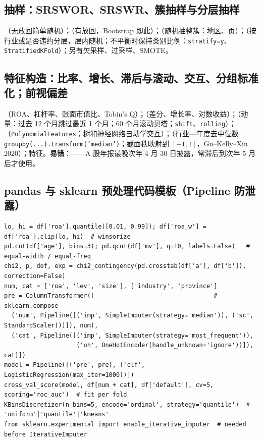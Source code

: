 \subsection{抽样：SRSWOR、SRSWR、簇抽样与分层抽样}
（无放回简单随机）；（有放回，Bootstrap 即此）；（随机抽整簇：地区、页）；（按行业或是否违约分层，层内随机；不平衡时保持类别比例：\texttt{stratify=y}、\texttt{StratifiedKFold}）；另有欠采样、过采样、SMOTE。

\subsection{特征构造：比率、增长、滞后与滚动、交互、分组标准化；前视偏差}
（ROA、杠杆率、账面市值比、Tobin's Q）；（差分、增长率、对数收益）；（动量：过去 12 个月跳过最近 1 个月；60 个月滚动贝塔；\texttt{shift}、\texttt{rolling}）；（\texttt{PolynomialFeatures}；树和神经网络自动学交互）；（行业—年度去中位数 \texttt{groupby(...).transform('median')}；截面秩映射到 $[-1,1]$，Gu–Kelly–Xiu 2020）；特征。\textbf{易错}：——A 股年报最晚次年 4 月 30 日披露，常滞后到次年 5 月后才使用。

\subsection{pandas 与 sklearn 预处理代码模板（Pipeline 防泄露）}
\begin{lstlisting}[basicstyle=\ttfamily\footnotesize]
lo, hi = df['roa'].quantile([0.01, 0.99]); df['roa_w'] = df['roa'].clip(lo, hi)  # winsorize
pd.cut(df['age'], bins=3); pd.qcut(df['mv'], q=10, labels=False)   # equal-width / equal-freq
chi2, p, dof, exp = chi2_contingency(pd.crosstab(df['a'], df['b']), correction=False)
num, cat = ['roa', 'lev', 'size'], ['industry', 'province']
pre = ColumnTransformer([                                 # sklearn.compose
  ('num', Pipeline([('imp', SimpleImputer(strategy='median')), ('sc', StandardScaler())]), num),
  ('cat', Pipeline([('imp', SimpleImputer(strategy='most_frequent')),
                    ('oh', OneHotEncoder(handle_unknown='ignore'))]), cat)])
model = Pipeline([('pre', pre), ('clf', LogisticRegression(max_iter=1000))])
cross_val_score(model, df[num + cat], df['default'], cv=5, scoring='roc_auc')  # fit per fold
KBinsDiscretizer(n_bins=5, encode='ordinal', strategy='quantile')  # 'uniform'|'quantile'|'kmeans'
from sklearn.experimental import enable_iterative_imputer  # needed before IterativeImputer
\end{lstlisting}

